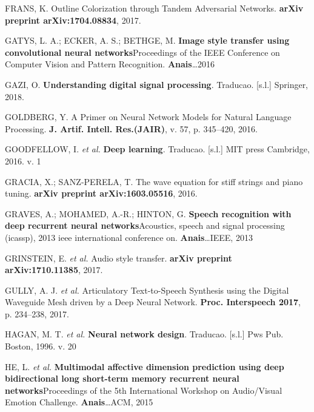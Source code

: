 \documentclass[]{article}
\begin{document}
\leavevmode\hypertarget{ref-frans2017outline}{}%
FRANS, K. Outline Colorization through Tandem Adversarial Networks.
\textbf{arXiv preprint arXiv:1704.08834}, 2017.

\leavevmode\hypertarget{ref-gatys2016image}{}%
GATYS, L. A.; ECKER, A. S.; BETHGE, M. \textbf{Image style transfer
using convolutional neural networks}Proceedings of the IEEE Conference
on Computer Vision and Pattern Recognition. \textbf{Anais}\ldots{}2016

\leavevmode\hypertarget{ref-gazi2018understanding}{}%
GAZI, O. \textbf{Understanding digital signal processing}. Traducao.
{[}s.l.{]} Springer, 2018.

\leavevmode\hypertarget{ref-goldberg2016primer}{}%
GOLDBERG, Y. A Primer on Neural Network Models for Natural Language
Processing. \textbf{J. Artif. Intell. Res.(JAIR)}, v. 57, p. 345--420,
2016.

\leavevmode\hypertarget{ref-goodfellow2016deep}{}%
GOODFELLOW, I. \emph{et al.} \textbf{Deep learning}. Traducao.
{[}s.l.{]} MIT press Cambridge, 2016. v. 1

\leavevmode\hypertarget{ref-gracia2016wave}{}%
GRACIA, X.; SANZ-PERELA, T. The wave equation for stiff strings and
piano tuning. \textbf{arXiv preprint arXiv:1603.05516}, 2016.

\leavevmode\hypertarget{ref-graves2013speech}{}%
GRAVES, A.; MOHAMED, A.-R.; HINTON, G. \textbf{Speech recognition with
deep recurrent neural networks}Acoustics, speech and signal processing
(icassp), 2013 ieee international conference on.
\textbf{Anais}\ldots{}IEEE, 2013

\leavevmode\hypertarget{ref-grinstein2017audio}{}%
GRINSTEIN, E. \emph{et al.} Audio style transfer. \textbf{arXiv preprint
arXiv:1710.11385}, 2017.

\leavevmode\hypertarget{ref-gully2017articulatory}{}%
GULLY, A. J. \emph{et al.} Articulatory Text-to-Speech Synthesis using
the Digital Waveguide Mesh driven by a Deep Neural Network.
\textbf{Proc. Interspeech 2017}, p. 234--238, 2017.

\leavevmode\hypertarget{ref-hagan1996neural}{}%
HAGAN, M. T. \emph{et al.} \textbf{Neural network design}. Traducao.
{[}s.l.{]} Pws Pub. Boston, 1996. v. 20

\leavevmode\hypertarget{ref-he2015multimodal}{}%
HE, L. \emph{et al.} \textbf{Multimodal affective dimension prediction
using deep bidirectional long short-term memory recurrent neural
networks}Proceedings of the 5th International Workshop on Audio/Visual
Emotion Challenge. \textbf{Anais}\ldots{}ACM, 2015
\end{document}
